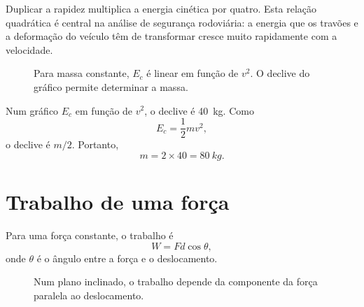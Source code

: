 \documentclass[11pt,a4paper,oneside]{book}
\begin{document}
\begin{leituragrafico}
Duplicar a rapidez multiplica a energia cinética por quatro. Esta relação quadrática é central na análise de segurança rodoviária: a energia que os travões e a deformação do veículo têm de transformar cresce muito rapidamente com a velocidade.
\end{leituragrafico}


\begin{figure}[H]
\centering
{}
\caption{Para massa constante, $E_c$ é linear em função de $v^2$. O declive do gráfico permite determinar a massa.}
\end{figure}

\begin{exemplo}[title=Exemplo resolvido -- massa a partir de um gráfico]
Num gráfico $E_c$ em função de $v^2$, o declive é \SI{40}{kg}. Como
\[
E_c=\frac12mv^2,
\]
o declive é $m/2$. Portanto,
\[
m=2\times40=\SI{80}{kg}.
\]
\end{exemplo}

\section{Trabalho de uma força}
Para uma força constante, o trabalho é
\[
W=Fd\cos\theta,
\]
onde $\theta$ é o ângulo entre a força e o deslocamento.

\begin{figure}[H]
\centering
{}
\caption{Num plano inclinado, o trabalho depende da componente da força paralela ao deslocamento.}
\end{figure}
\end{document}
